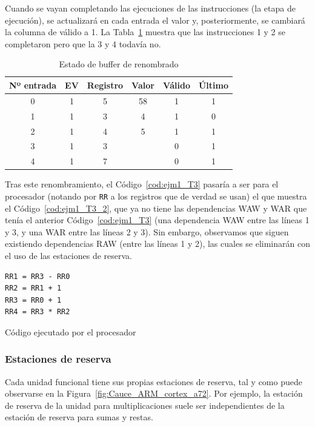 \begin{ejemplo}
\begin{itemize}
    \end{itemize}
    Cuando se vayan completando las ejecuciones de las instrucciones (la etapa de ejecución), se actualizará en cada entrada el valor y, posteriormente, se cambiará la columna de válido a 1. La Tabla~\ref{tab:ejm1_T3_2} muestra que las instrucciones 1 y 2 se completaron pero que la 3 y 4 todavía no.
    \begin{table}[H]
    \centering
    \begin{tabular}{|c|c|c|c|c|c|}
        \hline
        Nº entrada & EV & Registro & Valor & Válido & Último \\
        \hline
        0 & 1 & 5 & 58 & 1 & 1 \\
        \hline
        1 & 1 & 3 & 4 & 1 & 0 \\
        \hline
        2 & 1 & 4 & 5 & 1 & 1 \\
        \hline
        3 & 1 & 3 &   & 0 & 1 \\
        \hline
        4 & 1 & 7 &   & 0 & 1 \\
        \hline
    \end{tabular}
    \caption{Estado de buffer de renombrado}
    \label{tab:ejm1_T3_2}
    \end{table}
    Tras este renombramiento, el Código~\ref{cod:ejm1_T3} pasaría a ser para el procesador (notando por \verb|RR| a los registros que de verdad se usan) el que muestra el Código~\ref{cod:ejm1_T3_2}, que ya no tiene las dependencias WAW y WAR que tenía el anterior Código~\ref{cod:ejm1_T3} (una dependencia WAW entre las líneas 1 y 3, y una WAR entre las líneas 2 y 3). Sin embargo, observamos que siguen existiendo dependencias RAW (entre las líneas 1 y 2), las cuales se eliminarán con el uso de las estaciones de reserva.
    \begin{listing}[H]
    \begin{verbatim}
RR1 = RR3 - RR0        
RR2 = RR1 + 1
RR3 = RR0 + 1
RR4 = RR3 * RR2
    \end{verbatim}
    \caption{Código ejecutado por el procesador}
    \label{cod:ejm1_T3_2}
    \end{listing}
\end{ejemplo}

\subsubsection{Estaciones de reserva}
Cada unidad funcional tiene sus propias estaciones de reserva, tal y como puede observarse en la Figura~\ref{fig:Cauce_ARM_cortex_a72}. Por ejemplo, la estación de reserva de la unidad para multiplicaciones suele ser independientes de la estación de reserva para sumas y restas. 

